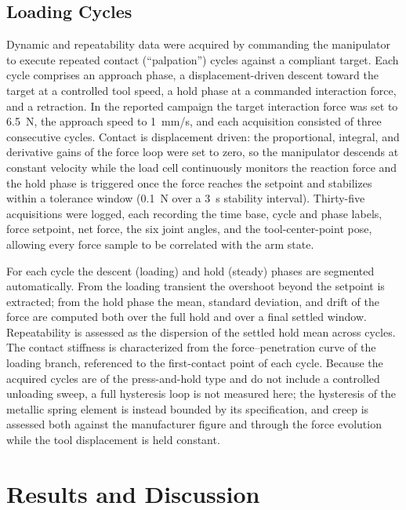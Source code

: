 \documentclass[conference]{IEEEtran}
\begin{document}
\subsection{Loading Cycles}
Dynamic and repeatability data were acquired by commanding the manipulator to execute repeated contact (``palpation'') cycles against a compliant target. Each cycle comprises an approach phase, a displacement-driven descent toward the target at a controlled tool speed, a hold phase at a commanded interaction force, and a retraction. In the reported campaign the target interaction force was set to 6.5~N, the approach speed to 1~mm/s, and each acquisition consisted of three consecutive cycles. Contact is displacement driven: the proportional, integral, and derivative gains of the force loop were set to zero, so the manipulator descends at constant velocity while the load cell continuously monitors the reaction force and the hold phase is triggered once the force reaches the setpoint and stabilizes within a tolerance window (0.1~N over a 3~s stability interval). Thirty-five acquisitions were logged, each recording the time base, cycle and phase labels, force setpoint, net force, the six joint angles, and the tool-center-point pose, allowing every force sample to be correlated with the arm state.

For each cycle the descent (loading) and hold (steady) phases are segmented automatically. From the loading transient the overshoot beyond the setpoint is extracted; from the hold phase the mean, standard deviation, and drift of the force are computed both over the full hold and over a final settled window. Repeatability is assessed as the dispersion of the settled hold mean across cycles. The contact stiffness is characterized from the force--penetration curve of the loading branch, referenced to the first-contact point of each cycle. Because the acquired cycles are of the press-and-hold type and do not include a controlled unloading sweep, a full hysteresis loop is not measured here; the hysteresis of the metallic spring element is instead bounded by its specification, and creep is assessed both against the manufacturer figure and through the force evolution while the tool displacement is held constant.

\section{Results and Discussion}\label{sec:results}
\end{document}
